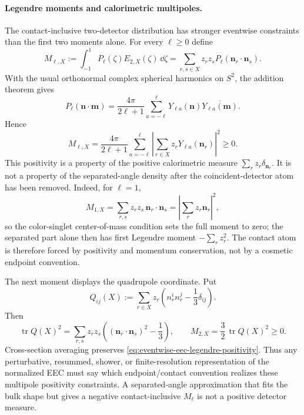 \paragraph{Legendre moments and calorimetric multipoles.}
The contact-inclusive two-detector distribution has stronger eventwise
constraints than the first two moments alone.  For every \(\ell\ge0\) define
\[
  M_{\ell,X}:=
  \int_{-1}^{1}P_\ell(\zeta)E_{2,X}(\zeta)\,\dd\zeta
  =
  \sum_{r,s\in X}z_rz_s P_\ell(\mathbf n_r\!\cdot\!\mathbf n_s).
\]
With the usual orthonormal complex spherical harmonics on \(S^2\), the
addition theorem gives
\[
  P_\ell(\mathbf n\!\cdot\!\mathbf m)
  =
  \frac{4\pi}{2\ell+1}
  \sum_{a=-\ell}^{\ell}
  Y_{\ell a}(\mathbf n)\overline{Y_{\ell a}(\mathbf m)} .
\]
Hence
\begin{equation}
  M_{\ell,X}
  =
  \frac{4\pi}{2\ell+1}
  \sum_{a=-\ell}^{\ell}
  \left|
    \sum_{r\in X} z_rY_{\ell a}(\mathbf n_r)
  \right|^2
  \ge0 .
  \label{eq:eventwise-eec-legendre-positivity}
\end{equation}
This positivity is a property of the positive calorimetric measure
\(\sum_r z_r\delta_{\mathbf n_r}\).  It is not a property of the
separated-angle density after the coincident-detector atom has been removed.
Indeed, for \(\ell=1\),
\[
  M_{1,X}
  =
  \sum_{r,s}z_rz_s\,\mathbf n_r\!\cdot\!\mathbf n_s
  =
  \left|\sum_r z_r\mathbf n_r\right|^2,
\]
so the color-singlet center-of-mass condition sets the full moment to zero;
the separated part alone then has first Legendre moment
\(-\sum_r z_r^2\).  The contact atom is therefore forced by positivity and
momentum conservation, not by a cosmetic endpoint convention.

The next moment displays the quadrupole coordinate.  Put
\[
  Q_{ij}(X):=
  \sum_{r\in X}z_r
  \left(n_r^in_r^j-\frac13\delta_{ij}\right).
\]
Then
\[
  \operatorname{tr}Q(X)^2
  =
  \sum_{r,s}z_rz_s
  \left((\mathbf n_r\!\cdot\!\mathbf n_s)^2-\frac13\right),
  \qquad
  M_{2,X}
  =
  \frac32\,\operatorname{tr}Q(X)^2
  \ge0 .
\]
Cross-section averaging preserves
\eqref{eq:eventwise-eec-legendre-positivity}.  Thus any perturbative,
resummed, shower, or finite-resolution representation of the normalized EEC
must say which endpoint/contact convention realizes these multipole
positivity constraints.  A separated-angle approximation that fits the bulk
shape but gives a negative contact-inclusive \(M_{\ell}\) is not a positive
detector measure.


